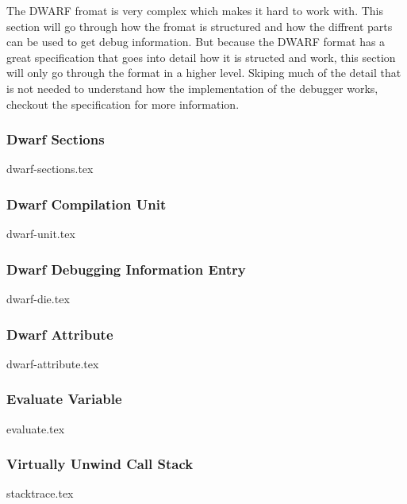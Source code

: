  


The \gls{DWARF} fromat is very complex which makes it hard to work with.
This section will go through how the fromat is structured and how the diffrent parts can be used to get debug information.
But because the \gls{DWARF} format has a great specification that goes into detail how it is structed and work, this section will only go through the format in a higher level.
Skiping much of the detail that is not needed to understand how the implementation of the debugger works, checkout the specification \cite{dwarf} for more information.


\subsubsection{Dwarf Sections}
{dwarf-sections.tex}


\subsubsection{Dwarf Compilation Unit}
{dwarf-unit.tex}


\subsubsection{Dwarf Debugging Information Entry}
{dwarf-die.tex}


\subsubsection{Dwarf Attribute}
{dwarf-attribute.tex}


\subsubsection{Evaluate Variable}
{evaluate.tex}


\subsubsection{Virtually Unwind Call Stack}
{stacktrace.tex}

